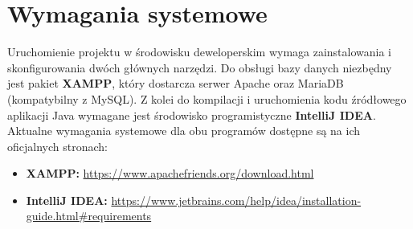 \section{Wymagania systemowe}
Uruchomienie projektu w środowisku deweloperskim wymaga zainstalowania i skonfigurowania dwóch głównych narzędzi. Do obsługi bazy danych niezbędny jest pakiet \textbf{XAMPP}, który dostarcza serwer Apache oraz MariaDB (kompatybilny z MySQL). Z kolei do kompilacji i uruchomienia kodu źródłowego aplikacji Java wymagane jest środowisko programistyczne \textbf{IntelliJ IDEA}. Aktualne wymagania systemowe dla obu programów dostępne są na ich oficjalnych stronach:
\begin{itemize}
    \item \textbf{XAMPP:} \url{https://www.apachefriends.org/download.html}
    \item \textbf{IntelliJ IDEA:} \url{https://www.jetbrains.com/help/idea/installation-guide.html#requirements}
\end{itemize}

